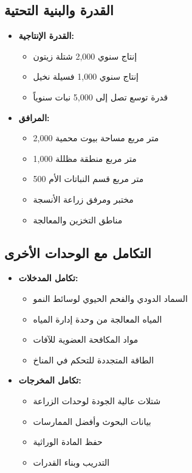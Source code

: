 \subsection{القدرة والبنية التحتية}
\begin{itemize}
    \item \textbf{القدرة الإنتاجية:}
    \begin{itemize}
        \item إنتاج سنوي 2,000 شتلة زيتون
        \item إنتاج سنوي 1,000 فسيلة نخيل
        \item قدرة توسع تصل إلى 5,000 نبات سنوياً
    \end{itemize}
    
    \item \textbf{المرافق:}
    \begin{itemize}
        \item 2,000 متر مربع مساحة بيوت محمية
        \item 1,000 متر مربع منطقة مظللة
        \item 500 متر مربع قسم النباتات الأم
        \item مختبر ومرفق زراعة الأنسجة
        \item مناطق التخزين والمعالجة
    \end{itemize}
\end{itemize}

\subsection{التكامل مع الوحدات الأخرى}
\begin{itemize}
    \item \textbf{تكامل المدخلات:}
    \begin{itemize}
        \item السماد الدودي والفحم الحيوي لوسائط النمو
        \item المياه المعالجة من وحدة إدارة المياه
        \item مواد المكافحة العضوية للآفات
        \item الطاقة المتجددة للتحكم في المناخ
    \end{itemize}
    
    \item \textbf{تكامل المخرجات:}
    \begin{itemize}
        \item شتلات عالية الجودة لوحدات الزراعة
        \item بيانات البحوث وأفضل الممارسات
        \item حفظ المادة الوراثية
        \item التدريب وبناء القدرات
    \end{itemize}
\end{itemize}

